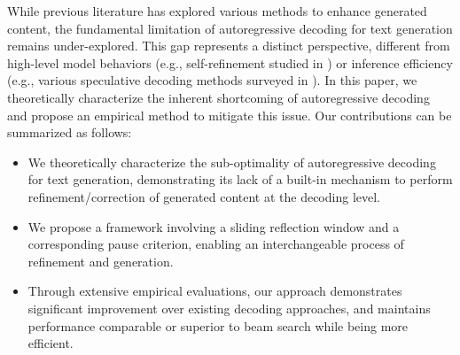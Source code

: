 While previous literature has explored various methods to enhance generated content, the fundamental limitation of autoregressive decoding for text generation remains under-explored.
This gap represents a distinct perspective, different from high-level model behaviors (e.g., self-refinement studied in \citealt{madaan2024self}) or inference efficiency (e.g., various speculative decoding methods surveyed in \citealt{xia2024unlocking}).
In this paper, we theoretically characterize the inherent shortcoming of autoregressive decoding and propose an empirical method to mitigate this issue.
Our contributions can be summarized as follows:
\begin{itemize}[topsep=0pt,leftmargin=*,noitemsep]
    \item We theoretically characterize the sub-optimality of autoregressive decoding for text generation, demonstrating its lack of a built-in mechanism to perform refinement/correction of generated content at the decoding level.
    \item We propose a framework involving a sliding reflection window and a corresponding pause criterion, enabling an interchangeable process of refinement and generation.
    \item Through extensive empirical evaluations, our approach demonstrates significant improvement over existing decoding approaches, and maintains performance comparable or superior to beam search while being more efficient.
\end{itemize}